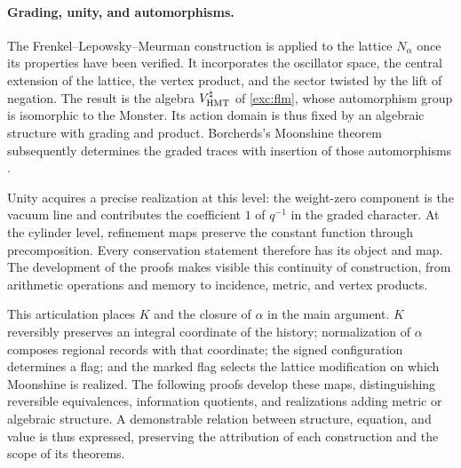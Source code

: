 \paragraph{Grading, unity, and automorphisms.}
\label{inc-ampl-automorfismos}
The Frenkel--Lepowsky--Meurman construction is applied to the lattice
$N_\alpha$ once its properties have been verified. It incorporates the oscillator
space, the central extension of the lattice, the vertex product,
and the sector twisted by the lift of negation. The result is
the algebra $V^\natural_{\rm HMT}$ of \eqref{exc:flm}, whose
automorphism group is isomorphic to the Monster. Its action domain is thus
fixed by an algebraic structure with grading and product. Borcherds's
Moonshine theorem subsequently determines the graded traces
with insertion of those automorphisms \cite{flm,borcherds}.

Unity acquires a precise realization at this level: the weight-zero
component is the vacuum line and contributes the coefficient $1$ of
$q^{-1}$ in the graded character. At the cylinder level,
refinement maps preserve the constant function through
precomposition. Every conservation statement therefore has its
object and map. The development of the proofs makes visible this
continuity of construction, from arithmetic operations and
memory to incidence, metric, and vertex products.

This articulation places $K$ and the closure of $\alpha$ in the main
argument. $K$ reversibly preserves an integral coordinate of the
history; normalization of $\alpha$ composes regional records
with that coordinate; the signed configuration determines a flag; and
the marked flag selects the lattice modification on which
Moonshine is realized. The following proofs develop these
maps, distinguishing reversible equivalences, information
quotients, and realizations adding metric or algebraic
structure. A demonstrable relation between structure,
equation, and value is thus expressed, preserving the attribution of each construction and the
scope of its theorems.
